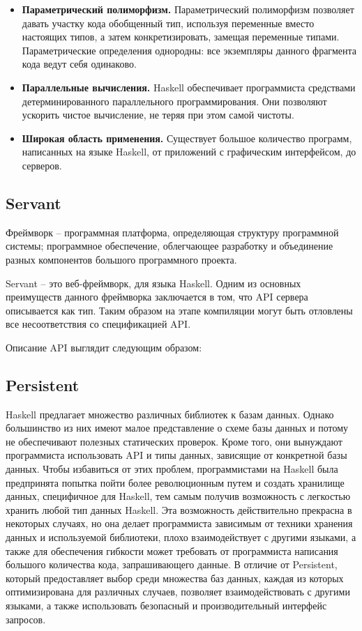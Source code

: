 \begin{itemize}
	\item \textbf{Параметрический полиморфизм.} Параметрический полиморфизм позволяет давать участку кода обобщенный тип, используя переменные вместо настоящих типов, а затем конкретизировать, замещая переменные типами. Параметрические определения однородны: все экземпляры данного фрагмента кода ведут себя одинаково.
	
	\item \textbf{Параллельные вычисления.} Haskell обеспечивает программиста средствами детерминированного параллельного программирования. Они позволяют ускорить чистое вычисление, не теряя при этом самой чистоты.
	
	\item \textbf{Широкая область применения.} Существует большое количество программ, написанных на языке Haskell, от приложений с графическим интерфейсом, до серверов.
	
	 
\end{itemize}

\subsection{Servant}
Фреймворк -- программная платформа, определяющая структуру программной системы; программное обеспечение, облегчающее разработку и объединение разных компонентов большого программного проекта.

Servant -- это веб-фреймворк, для языка Haskell. Одним из основных преимуществ данного фреймворка заключается в том, что API сервера описывается как тип. Таким образом на этапе компиляции могут быть отловлены все несоответствия со спецификацией API.

Описание API выглядит следующим образом: 


\subsection{Persistent}
Haskell предлагает множество различных библиотек к базам данных. Однако большинство из них имеют малое представление о схеме базы данных и потому не обеспечивают полезных статических проверок. Кроме того, они вынуждают программиста использовать API и типы данных, зависящие от конкретной базы данных. Чтобы избавиться от этих проблем, программистами на Haskell была предпринята попытка пойти более революционным путем и создать хранилище данных, специфичное для Haskell, тем самым получив возможность с легкостью хранить любой тип данных Haskell. Эта возможность действительно прекрасна в некоторых случаях, но она делает программиста зависимым от техники хранения данных и используемой библиотеки, плохо взаимодействует с другими языками, а также для обеспечения гибкости может требовать от программиста написания большого количества кода, запрашивающего данные. В отличие от Persistent, который предоставляет выбор среди множества баз данных, каждая из которых оптимизирована для различных случаев, позволяет взаимодействовать с другими языками, а также использовать безопасный и производительный интерфейс запросов.

